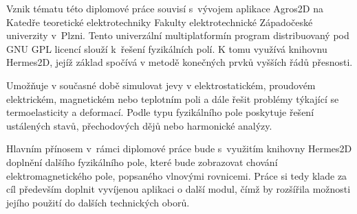 Vznik tématu této diplomové práce souvisí s~vývojem aplikace Agros2D na Katedře teoretické elektrotechniky Fakulty elektrotechnické Západočeské univerzity v~Plzni. Tento univerzální multiplatformín program distribuovaný pod GNU GPL licencí slouží k~řešení fyzikálních polí. K tomu využívá knihovnu Hermes2D, jejíž základ spočívá v metodě konečných prvků vyšších řádů přesnosti.  

Umožňuje v současné době simulovat jevy v elektrostatickém, proudovém elektrickém, magnetickém nebo teplotním poli a dále řešit problémy týkající se termoelasticity a deformací. Podle typu fyzikálního pole poskytuje řešení ustálených stavů, přechodových dějů nebo harmonické analýzy.  

Hlavním přínosem v~rámci diplomové práce bude s~využitím knihovny Hermes2D doplnění dalšího fyzikálního pole, které bude zobrazovat chování elektromagnetického pole, popsaného vlnovými rovnicemi. Práce si tedy klade za cíl především doplnit vyvíjenou aplikaci o další modul, čímž by rozšířila možnosti jejího použití do dalších technických oborů. 
